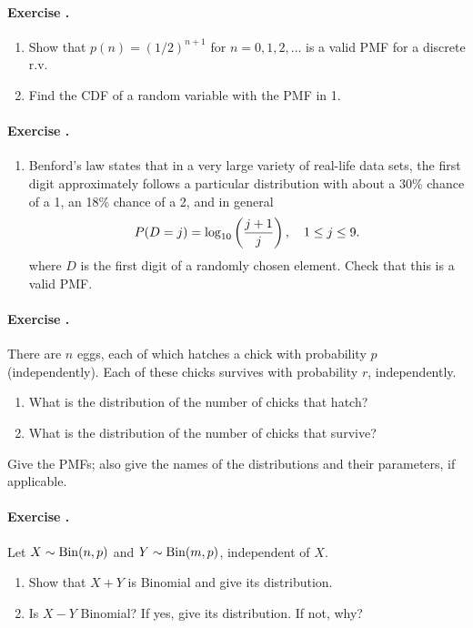 \documentclass[twocolumn,12pt,a4paper]{article}
\newcounter{num}  %
\begin{document}
	\paragraph{Exercise \thenum.}
	\begin{enumerate}
		\item Show that $p(n) = ( 1/2)^{n+1}$ for $n = 0, 1, 2,\ldots$ is a valid PMF for a discrete r.v.
		\item  Find the CDF of a random variable with the PMF in 1.
	\end{enumerate}
	
	\paragraph{Exercise \thenum.}
	\begin{enumerate}
		\item Benford's law states that in a very large variety of real-life data sets, the first digit approximately follows a particular distribution with about a 30\% chance of a 1, an 18\% chance of a 2, and in general
		$$
		P(D = j) = {\rm log}_{10}\left(\frac{j+1}{j}\right),\quad  1\leq j\leq 9.
		$$ 
		where $D$ is the first digit of a randomly chosen element. Check that this is a valid PMF.
	\end{enumerate}
	
	
	\paragraph{Exercise \thenum.}
	There are $n$ eggs, each of which hatches a chick with probability $p$ (independently).
	Each of these chicks survives with probability $r$, independently. \begin{enumerate}
		\item What is the distribution of the number of chicks that hatch? 
	\item What is the distribution of the number of chicks that
	survive? 
	\end{enumerate}
	Give the PMFs; also give the names of the distributions and their parameters, if applicable.
	
	\paragraph{Exercise \thenum.}
	Let $X \sim {\rm Bin}(n, p)$ and $Y \sim {\rm Bin}(m, p)$, independent of $X$.
	\begin{enumerate}
		\item  Show that $X+Y$ is Binomial and give its distribution.
	\item  Is $X-Y$ Binomial? If yes, give its distribution. If not, why?
	\end{enumerate}
	
\end{document}
